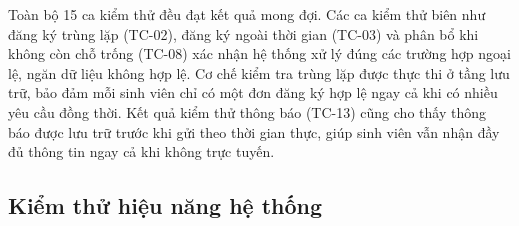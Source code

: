\documentclass[../DoAn.tex]{subfiles}
\begin{document}
Toàn bộ 15 ca kiểm thử đều đạt kết quả mong đợi. Các ca kiểm thử biên như đăng ký trùng lặp (TC-02), đăng ký ngoài thời gian (TC-03) và phân bổ khi không còn chỗ trống (TC-08) xác nhận hệ thống xử lý đúng các trường hợp ngoại lệ, ngăn dữ liệu không hợp lệ. Cơ chế kiểm tra trùng lặp được thực thi ở tầng lưu trữ, bảo đảm mỗi sinh viên chỉ có một đơn đăng ký hợp lệ ngay cả khi có nhiều yêu cầu đồng thời. Kết quả kiểm thử thông báo (TC-13) cũng cho thấy thông báo được lưu trữ trước khi gửi theo thời gian thực, giúp sinh viên vẫn nhận đầy đủ thông tin ngay cả khi không trực tuyến.

\subsection{Kiểm thử hiệu năng hệ thống}
\label{subsec:performance-test}
\end{document}
